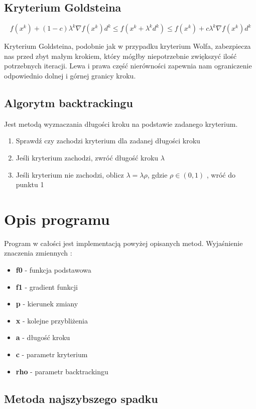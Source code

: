 \documentclass{classrep}
\begin{document}
\subsection{Kryterium Goldsteina}
\begin{equation}
f( x^{k} ) + (1-c) \lambda ^{k} \nabla f(x^{k}) d^{k} \leq f(x^{k}+ \lambda ^{k} d^{k} ) \leq f(x^{k}) + c \lambda ^{k} \nabla f(x^{k} ) d^{k}
\end{equation}

Kryterium Goldsteina, podobnie jak w przypadku kryterium Wolfa, zabezpiecza nas przed zbyt małym krokiem, który mógłby niepotrzebnie zwiększyć ilość potrzebnych iteracji. Lewa i prawa część nierówności zapewnia nam ograniczenie odpowiednio dolnej i górnej granicy kroku.

\subsection{Algorytm backtrackingu}
Jest metodą wyznaczania długości kroku na podstawie zadanego kryterium.
\begin{enumerate}
\item Sprawdź czy zachodzi kryterium dla zadanej długości kroku
\item Jeśli kryterium zachodzi, zwróć długość kroku $\lambda$
\item Jeśli kryterium nie zachodzi, oblicz $\lambda =\lambda \rho$, gdzie $\rho \in (0,1)$ , wróć do punktu 1
\end{enumerate}

\section{Opis programu}
Program w całości jest implementacją powyżej opisanych metod. 
Wyjaśnienie znaczenia zmiennych :
\begin{itemize}
\item \textbf{f0} - funkcja podstawowa
\item \textbf{f1} - gradient funkcji
\item \textbf{p} - kierunek zmiany
\item \textbf{x} - kolejne przybliżenia
\item \textbf{a} - długość kroku
\item \textbf{c} - parametr kryterium
\item \textbf{rho} - parametr backtrackingu
\end{itemize}

\subsection{Metoda najszybszego spadku}
\end{document}
